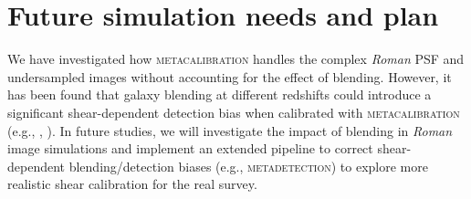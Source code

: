 \documentclass[fleqn,usenatbib]{mnras}
\begin{document}
\section{Future simulation needs and plan}
\label{sec:discussion}

We have investigated how \textsc{metacalibration} handles the complex \emph{Roman} PSF and undersampled images without accounting for the effect of blending. However, it has been found that galaxy blending at different redshifts could introduce a significant shear-dependent detection bias when calibrated with \textsc{metacalibration} (e.g., \citealt{2020ApJ...902..138S}, \citealt{2020arXiv201208567M}). In future studies, we will investigate the impact of blending in \emph{Roman} image simulations and implement an extended pipeline to correct shear-dependent blending/detection biases (e.g.,  \textsc{metadetection}) to explore more realistic shear calibration for the real survey. 
\end{document}

